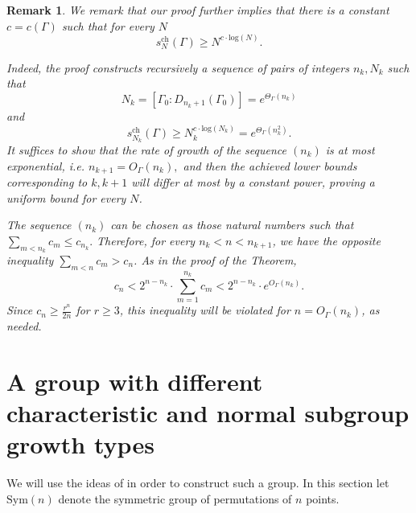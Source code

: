 \documentclass[letterpaper]{amsart}
\newtheorem{remark}[theorem]{Remark}
\begin{document}
\begin{remark}
We remark that our proof further implies that there is a constant $c = c(\Gamma)$ such that for every $N$
$$s_N^{\mathrm{ch}}(\Gamma) \geq N^{c\cdot\mathrm{log}(N)}.$$

Indeed, the proof constructs recursively a sequence of pairs of integers $n_k, N_k$ such that
$$N_k = [\Gamma_0:D_{n_k + 1}(\Gamma_0)] = e^{\Theta_{\Gamma}(n_k)}$$ and
$$s_{N_k}^{\mathrm{ch}}(\Gamma) \geq N_k^{c \cdot \mathrm{log}(N_k)} = e^{\Theta_{\Gamma}(n_k^2)}.$$
It suffices to show that the rate of growth of the sequence $(n_k)$ is at most exponential, i.e. $n_{k + 1} = O_\Gamma(n_k),$ and then the achieved lower bounds corresponding to $k, k + 1$    will differ at most by a constant power, proving a uniform bound for every $N$.

The sequence $(n_k)$ can be chosen as those natural numbers such that $\sum_{m < n_k} c_m \leq c_{n_k}.$ Therefore, for every $n_k < n < n_{k + 1}$, we have the opposite inequality $\sum_{m < n} c_m > c_n$. As in the proof of the Theorem,
$$c_n < 2^{n - n_k} \cdot \sum_{m = 1}^{n_k} c_m < 2^{n - n_k} \cdot e^{O_\Gamma(n_k)}.$$
Since $c_n \geq \frac{r^n}{2n}$ for $r \geq 3$, this inequality will be violated for $n = O_\Gamma(n_k)$, as needed.
\end{remark}

\section{A group with different characteristic and normal subgroup growth types}
\label{Section on Segal's groups}
We will use the ideas of \cite{segal2000finite} in order to construct such a group. In this section let $\mathrm{Sym}(n)$ denote the symmetric group of permutations of $n$ points.
\end{document}
